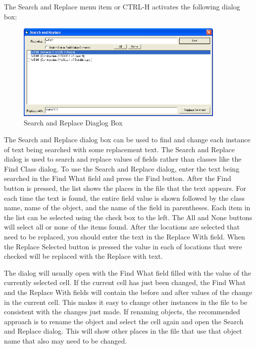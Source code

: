 The Search and Replace menu item or CTRL-H activates the following dialog box:

\begin{figure}[hbtp] %
\centering
\includegraphics[width=0.9\textwidth, height=0.9\textheight, keepaspectratio=true]{media/image119.png}
\caption{Search and Replace Diaglog Box \protect \label{fig:search-and-replace-diaglog-box}}
\end{figure}

The Search and Replace dialog box can be used to find and change each instance of text being searched with some replacement text. The Search and Replace dialog is used to search and replace values of fields rather than classes like the Find Class dialog. To use the Search and Replace dialog, enter the text being searched in the Find What field and press the Find button. After the Find button is pressed, the list shows the places in the file that the text appears. For each time the text is found, the entire field value is shown followed by the class name, name of the object, and the name of the field in parentheses. Each item in the list can be selected using the check box to the left. The All and None buttons will select all or none of the items found. After the locations are selected that need to be replaced, you should enter the text in the Replace With field. When the Replace Selected button is pressed the value in each of locations that were checked will be replaced with the Replace with text.

The dialog will usually open with the Find What field filled with the value of the currently selected cell. If the current cell has just been changed, the Find What and the Replace With fields will contain the before and after values of the change in the current cell. This makes it easy to change other instances in the file to be consistent with the changes just made. If renaming objects, the recommended approach is to rename the object and select the cell again and open the Search and Replace dialog. This will show other places in the file that use that object name that also may need to be changed.

